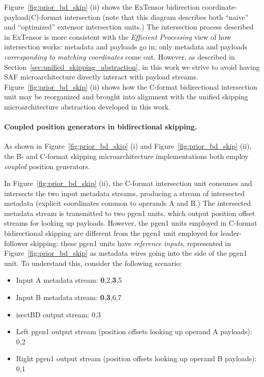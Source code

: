 Figure~\ref{fig:prior_bd_skip} (ii) shows the ExTensor\cite{extensor} bidirection coordinate-payload(C)-format intersection (note that this diagram describes both ``naive'' and ``optimized'' extensor intersection units\cite{extensor}.) The intersection process described in ExTensor is more consistent with the \textit{Efficient Processing} view of how intersection works: metadata and payloads go in; only metadata and payloads \textit{corresponding to matching coordinates} come out. However, as described in Section~\ref{sec:unified_skipping_abstraction}, in this work we strive to avoid having SAF microarchitecture directly interact with payload streams. Figure~\ref{fig:prior_bd_skip} (ii) shows how the C-format bidirectional intersection unit may be reorganized and brought into alignment with the unified skipping microarchitecture abstraction developed in this work.

\paragraph{Coupled position generators in bidirectional skipping.}

As shown in Figure~\ref{fig:prior_bd_skip} (i) and Figure~\ref{fig:prior_bd_skip} (ii), the B- and C-format skipping microarchitecture implementations both employ \textit{coupled} position generators.

In Figure~\ref{fig:prior_bd_skip} (ii), the C-format intersection unit consumes and intersects the two input metadata streams, producing a stream of intersected metadata (explicit coordinates common to operands A and B.) The intersected metadata stream is transmitted to two pgen1 units, which output position offset streams for looking up payloads. However, the pgen1 units employed in C-format bidirectional skipping are different from the pgen1 unit employed for leader-follower skipping: these pgen1 units have \textit{reference inputs}, represented in Figure~\ref{fig:prior_bd_skip} as metadata wires going into the side of the pgen1 unit. To understand this, consider the following scenario:

\begin{itemize}
    \item Input A metadata stream: \textbf{0},2,\textbf{3},5
    \item Input B metadata stream: \textbf{0},\textbf{3},6,7
    \item isectBD output stream: 0,3
    \item Left pgen1 output stream (position offsets looking up operand A payloads): 0,2
    \item Right pgen1 output stream (position offsets looking up operand B payloads): 0,1
\end{itemize}

